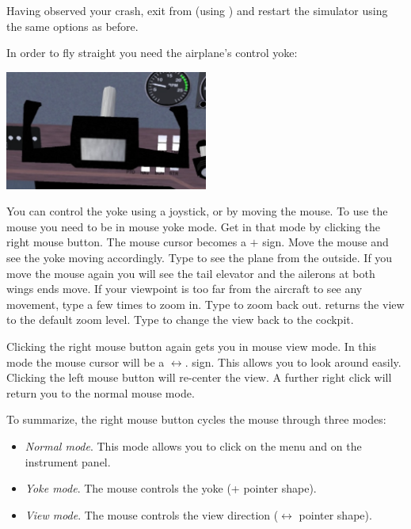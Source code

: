 Having observed your crash, exit from \FlightGear (using ) 
and restart the simulator using the same options as before.

In order to fly straight you need the airplane's control yoke:

\begin{center}
\includegraphics[width=0.5\textwidth]{img/tut_10}
\end{center}

You can control the yoke using a joystick, or by moving the mouse. To use the
mouse you need to be in mouse yoke mode. Get in that mode by clicking the right
mouse button. The mouse cursor becomes a $+$ sign. Move the mouse and see the 
yoke moving accordingly. Type  to see the plane from the outside. If you
move the mouse again you will see the tail elevator and the ailerons at both 
wings ends move. If your viewpoint is too far from the aircraft to see any
movement, type  a few times to zoom in. 
Type  to zoom back out.  returns the view to the default zoom
level. Type  to change the view back to the cockpit.

Clicking the right mouse button again gets you in mouse view mode.
In this mode the mouse cursor will be a $\leftrightarrow$. sign. This allows you
to look around easily. Clicking the left mouse button will re-center the view. 
A further right click will return you to the normal mouse mode.

To summarize, the right mouse button cycles the mouse through three modes:
\begin{itemize}
	\item \textit{Normal mode}. This mode allows you to 
  click on the menu and on the instrument panel.
	\item \textit{Yoke mode}. 
  The mouse controls the yoke (+ pointer shape). 
	\item \textit{View mode}. The mouse controls the 
  view direction ($\leftrightarrow$ pointer shape).
\end{itemize}

